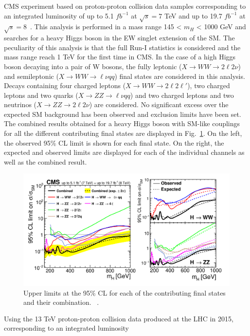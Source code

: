 CMS experiment based on  proton-proton collision data samples corresponding to an integrated luminosity of up to 5.1 $fb^{-1}$ at $\sqrt{s}=7$ TeV and up to 19.7  $fb^{-1}$ at $\sqrt{s}=8$~\cite{Khachatryan:2015cwa}. This analysis is performed in a mass range 145 < $m_H$ < 1000 GeV and searches for a heavy Higgs boson in the EW singlet extension of the SM. The peculiarity of this analysis is that the full Run-I statistics is considered and the mass range reach 1 TeV for the first time in CMS.
In the case of a high Higgs boson decaying into a pair of W bosons, the fully leptonic ($X \to WW \to 2\ell 2\nu$) and semileptonic ($X \to WW \to \ell \nu qq$) final
states are considered in this  analysis. 
Decays containing four charged leptons  ($X \to WW \to 2\ell 2\ell'$), two charged leptons and two quarks ($X \to ZZ \to \ell \nu qq$) and two charged leptons and two neutrinos ($X \to ZZ \to 2\ell 2\nu$) are considered. No significant excess over the expected
SM background has been observed and exclusion limits have been set. The combined results obtained for a heavy Higgs boson with SM-like couplings for all
the different contributing final states are displayed in Fig.~\ref{plots_combination_combinedSM_def}. On the left, the observed
95\% CL limit is shown for each final state. On the right, the expected and observed limits are
displayed for each of the individual channels as well as the combined result.
\begin{figure}
\centering
\includegraphics[scale= 0.9]{../Cap1/plots_combination_combinedSM_def}
\caption{Upper limits at the 95\% CL for each of the contributing final states and their combination.  ~\cite{Khachatryan:2015cwa}. }
\label{plots_combination_combinedSM_def}
\end{figure}
Using the 13 TeV proton-proton collision data produced at the LHC in 2015, corresponding to an integrated luminosity
